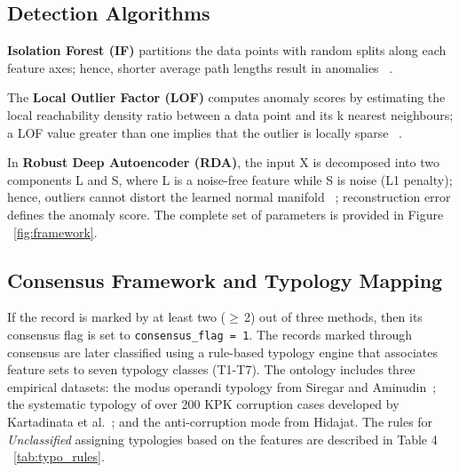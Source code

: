 \documentclass[3p,times,procedia]{elsarticle}
\begin{document}
\subsection{Detection Algorithms}

\textbf{Isolation Forest (IF)} partitions the data points with random splits along each feature axes; hence, shorter average path lengths result in anomalies ~\cite{ref24, ref25}.

The \textbf{Local Outlier Factor (LOF)} computes anomaly scores by estimating the local reachability density ratio between a data point and its k nearest neighbours; a LOF value greater than one implies that the outlier is locally sparse ~\cite{ref26}.

In \textbf{Robust Deep Autoencoder (RDA)}, the input X is decomposed into two components L and S, where L is a noise-free feature while S is noise (L1 penalty); hence, outliers cannot distort the learned normal manifold ~\cite{ref27}; reconstruction error defines the anomaly score. The complete set of parameters is provided in Figure ~\ref{fig:framework}.

\subsection{Consensus Framework and Typology Mapping}

If the record is marked by at least two ($\geq$\,2) out of three methods, then its consensus flag is set to \texttt{consensus\_flag = 1}. The records marked through consensus are later classified using a rule-based typology engine that associates feature sets to seven typology classes (T1-T7). The ontology includes three empirical datasets: the modus operandi typology from Siregar and Aminudin~\cite{ref13}; the systematic typology of over 200 KPK corruption cases developed by Kartadinata et al.~\cite{ref14}; and the anti-corruption mode from Hidajat. The rules for \textit{Unclassified} assigning typologies based on the features are described in Table 4 ~\ref{tab:typo_rules}.
\end{document}
